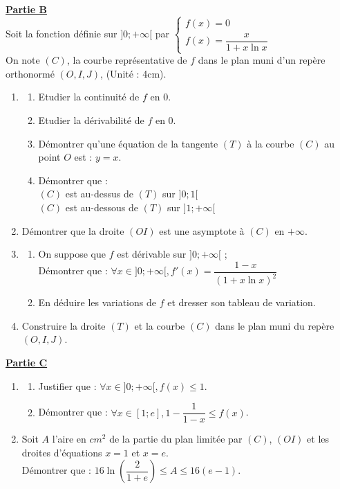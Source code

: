 \documentclass[12pt,a4paper]{article}
\begin{document}
\noindent \underline{\textbf{Partie B}} \\
Soit la fonction définie sur $]0; +\infty[$ par 
$\begin{cases} f(x) = 0 \\ f(x) = \dfrac{x}{1+x\ln x} \end{cases}$ \\
On note $(C)$, la courbe représentative de $f$ dans le plan muni d'un repère orthonormé $(O, I, J)$, (Unité : 4cm).
\begin{enumerate}
    \item \begin{enumerate}
        \item Etudier la continuité de $f$ en 0.
        \item Etudier la dérivabilité de $f$ en 0.
        \item Démontrer qu'une équation de la tangente $(T)$ à la courbe $(C)$ au point $O$ est : $y = x$.
        \item Démontrer que : \\
        $(C)$ est au-dessus de $(T)$ sur $]0; 1[$ \\
        $(C)$ est au-dessous de $(T)$ sur $]1; +\infty[$
    \end{enumerate}
    \item Démontrer que la droite $(OI)$ est une asymptote à $(C)$ en $+\infty$.
    \item \begin{enumerate}
        \item On suppose que $f$ est dérivable sur $]0; +\infty[$ ; \\
        Démontrer que : $\forall x \in ]0; +\infty[, f'(x) = \dfrac{1-x}{(1+x\ln x)^2}$
        \item En déduire les variations de $f$ et dresser son tableau de variation.
    \end{enumerate}
    \item Construire la droite $(T)$ et la courbe $(C)$ dans le plan muni du repère $(O, I, J)$.
\end{enumerate}

\vspace{0.5cm}

\noindent \underline{\textbf{Partie C}} \\
\begin{enumerate}
    \item \begin{enumerate}
        \item Justifier que : $\forall x \in ]0; +\infty[, f(x) \le 1$.
        \item Démontrer que : $\forall x \in [1; e], 1 - \dfrac{1}{1-x} \le f(x)$.
    \end{enumerate}
    \item Soit $A$ l'aire en $cm^2$ de la partie du plan limitée par $(C)$, $(OI)$ et les droites d'équations $x = 1$ et $x = e$. \\
    Démontrer que : $16\ln\left(\dfrac{2}{1+e}\right) \le A \le 16(e-1)$.
\end{enumerate}
\end{document}
